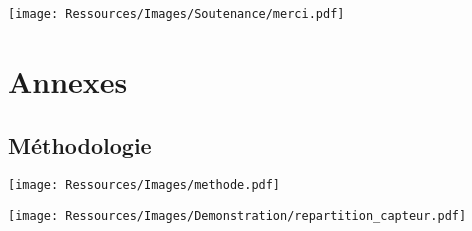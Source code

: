 \documentclass[xcolor=x11names, compress, 11pt]{beamer}
\newcommand{\addalert}[1]{%
\begin{beamercolorbox}[sep=2pt,center,shadow=true,rounded=true]{alerted text}
    #1\par%
\end{beamercolorbox}%
}
\begin{document}
\section*{}
{
\begin{frame}[plain, c]
    \vfill
    \texttt{[image: Ressources/Images/Soutenance/merci.pdf]}
    \vfill
\end{frame}
}




\appendix
\section{Annexes}
\subsection{Méthodologie}
\begin{frame}[noframenumbering, c]
    \vfill
    \centering
    \texttt{[image: Ressources/Images/methode.pdf]}
    \vfill
\end{frame}


\begin{frame}[noframenumbering, c]
    \vfill
    \centering
    \texttt{[image: Ressources/Images/Demonstration/repartition\_capteur.pdf]}
    \vfill
\end{frame}


\end{document}
